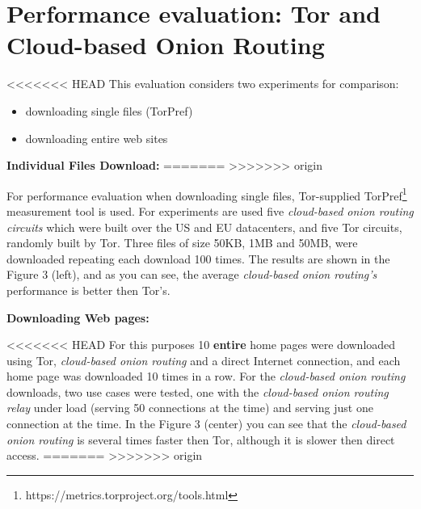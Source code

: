 \documentclass{acm_proc_article-sp}
\begin{document}

\section{Performance evaluation: Tor and Cloud-based Onion Routing}

<<<<<<< HEAD
This evaluation considers two experiments for comparison: \cite{cite2}
\begin{itemize}
  \item downloading single files (TorPref)
  \item downloading entire web sites
\end{itemize}

\textbf{Individual Files Download:}
=======
%
>>>>>>> origin

For performance evaluation when downloading single files, Tor-supplied TorPref\footnote{https://metrics.torproject.org/tools.html} measurement tool is used. For experiments are used five \textit{cloud-based onion routing circuits} which were built over the US and EU datacenters, and five Tor circuits, randomly built by Tor. Three files of size 50KB, 1MB and 50MB, were downloaded repeating each download 100 times. The results are shown in the Figure 3 (left), and as you can see, the average \textit{cloud-based onion routing's} performance is better then Tor's.\cite{cite2}

\textbf{Downloading Web pages:}

<<<<<<< HEAD
For this purposes 10 \textbf{entire} home pages were downloaded using Tor, \textit{cloud-based onion routing} and a direct Internet connection, and each home page was downloaded 10 times in a row. For the \textit{cloud-based onion routing} downloads, two use cases were tested, one with the \textit{cloud-based onion routing relay} under load (serving 50 connections at the time) and serving just one connection at the time. In the Figure 3 (center) you can see that the \textit{cloud-based onion routing} is several times faster then Tor, although it is slower then direct access.\cite{cite2}
=======
>>>>>>> origin
\end{document}
